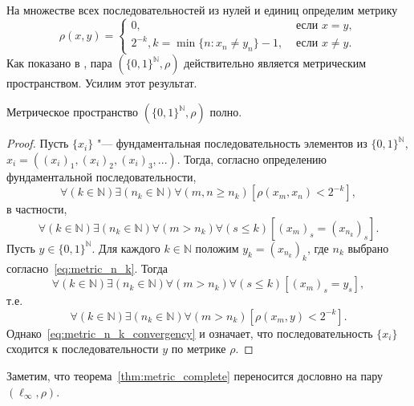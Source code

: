 На множестве всех последовательностей из нулей и единиц определим метрику
$$
	\rho(x,y)=
	\begin{cases}
		0, & \mbox{~если~} x=y, \\
		2^{-k}, k = \min\{n:x_n \neq y_n\} - 1, & \mbox{~если~} x\neq y. %
	\end{cases}
$$
Как показано в \cite[Утверждение 2.1.8]{Edgar}, пара $(\{0,1\}^\mathbb{N}, \rho)$ действительно является метрическим пространством.
Усилим этот результат.

\begin{theorem}
	\label{thm:metric_complete}
	Метрическое пространство $(\{0,1\}^\mathbb{N}, \rho)$ полно.
\end{theorem}

\begin{proof}
	Пусть $\{x_i\}$ "--- фундаментальная последовательность элементов из $\{0,1\}^\mathbb{N}$,
	$x_i=\left((x_i)_1, (x_i)_2, (x_i)_3,...\right)$.
	Тогда, согласно определению фундаментальной последовательности,
	\begin{equation}
		\forall(k\in\mathbb{N})
		\exists(n_k \in \mathbb{N})
		\forall(m,n \geq n_k)
		[\rho(x_m,x_n)< 2^{-k}]
		,
	\end{equation}
	в частности,
	\begin{equation}
		\label{eq:metric_n_k}
		\forall(k\in\mathbb{N})
		\exists(n_k \in \mathbb{N})
		\forall(m > n_k)
		\forall(s \leq k)
		\left[
			\left(x_m\right)_s = \left(x_{n_k}\right)_s
		\right]
		.
	\end{equation}
	Пусть $y\in\{0,1\}^\mathbb{N}$. Для каждого $k\in\mathbb{N}$ положим $y_k = \left(x_{n_k}\right)_k$,
	где $n_k$ выбрано согласно~\eqref{eq:metric_n_k}.
	Тогда
	\begin{equation}
		\forall(k\in\mathbb{N})
		\exists(n_k \in \mathbb{N})
		\forall(m > n_k)
		\forall(s \leq k)
		\left[
			\left(x_m\right)_s = y_s
		\right]
		,
	\end{equation}
	т.е.
	\begin{equation}
		\label{eq:metric_n_k_convergency}
		\forall(k\in\mathbb{N})
		\exists(n_k \in \mathbb{N})
		\forall(m > n_k)
		\left[
			\rho(x_m,y)< 2^{-k}
		\right]
		.
	\end{equation}
	Однако~\eqref{eq:metric_n_k_convergency} и означает,
	что последовательность $\{x_i\}$ сходится к последовательности $y$ по метрике $\rho$.
\end{proof}

Заметим, что теорема~\ref{thm:metric_complete} переносится дословно на пару $(\ell_\infty,\rho)$.
